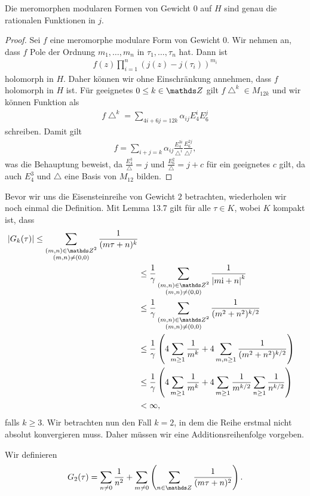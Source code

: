 \begin{prop}
Die meromorphen modularen Formen von Gewicht $0$ auf $H$ sind genau
die rationalen Funktionen in $j$.
\end{prop}
\begin{proof}
Sei $f$ eine meromorphe modulare Form von Gewicht $0$.
Wir nehmen an, dass $f$ Pole der Ordnung $m_1,\dots,m_n$
in $\tau_1,\dots,\tau_n$ hat.
Dann ist
\begin{align*}
f(z)\prod_{i=1}^n (j(z)-j(\tau_i))^{m_i}
\end{align*}
holomorph in $H$.
Daher können wir ohne Einschränkung annehmen, dass $f$ holomorph in $H$ ist.
Für geeignetes $0\leq k \in \Z$ gilt $f\bigtriangleup^k \in M_{12k}$ und wir können Funktion als
\begin{align*}
f\bigtriangleup^k=\sum_{4i+6j=12k} \alpha_{ij} E_4^i E_6^j
\end{align*}
schreiben.
Damit gilt
\begin{align*}
f=\sum_{i+j=k} \alpha_{ij} \frac{E_4^{3i}}{\bigtriangleup^i} \frac{E_6^{2j}}{\bigtriangleup^j},
\end{align*}
was die Behauptung beweist, da $\frac{E_4^3}{\bigtriangleup}=j$ und
$\frac{E_6^2}{\bigtriangleup}=j+c$ für ein geeignetes $c$ gilt, da auch $E_4^3$ und $\bigtriangleup$ eine Basis von $M_{12}$ bilden.
\end{proof}

Bevor wir uns die Eisensteinreihe von Gewicht $2$ betrachten, wiederholen wir noch einmal die Definition.
Mit Lemma 13.7 gilt für alle $\tau \in K$, wobei $K$ kompakt ist, dass
\begin{align*}
\abs{G_k(\tau)}\leq \sum_{\substack{(m,n)\in \Z^2\\ (m,n)\not = (0,0)}} \frac{1}{(m\tau +n )^k}\\
&\leq\frac{1}{\gamma} \sum_{\substack{(m,n)\in \Z^2\\ (m,n)\not = (0,0)}}\frac{1}{\abs{m\mathrm{i}+n}^k} \\
&\leq \frac{1}{\gamma} \sum_{\substack{(m,n)\in \Z^2\\ (m,n)\not = (0,0)}} \frac{1}{(m^2+n^2)^{k/2}}\\
&\leq \frac{1}{\gamma} \left(4 \sum_{m\geq 1} \frac{1}{m^k}+4\sum_{m,n\geq 1} \frac{1}{(m^2+n^2)^{k/2}} \right)\\
&\leq \frac{1}{\gamma} \left( 4 \sum_{m\geq 1} \frac{1}{m^k}+4 \sum_{m\geq 1} \frac{1}{m^{k/2}} \sum_{n\geq 1} \frac{1}{n^{k/2}}\right)\\
&<\infty,
\end{align*}
falls $k\geq 3$.
Wir betrachten nun den Fall $k=2$, in dem die Reihe erstmal nicht
absolut konvergieren muss.
Daher müssen wir eine Additionsreihenfolge vorgeben.
\begin{defi}
Wir definieren
\begin{align*}
G_2(\tau)=\sum_{n \not =0} \frac{1}{n^2} +\sum_{m \not =0} \left( \sum_{n\in \Z} \frac{1}{(m\tau+n)^2}\right).
\end{align*}
\end{defi}

